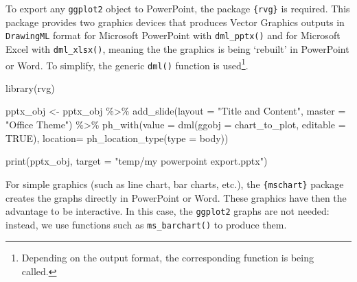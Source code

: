 \documentclass[
]{book}
\newenvironment{Shaded}{\begin{snugshade}}{\end{snugshade}}
\newcommand{\AttributeTok}[1]{\textcolor[rgb]{0.77,0.63,0.00}{#1}}
\newcommand{\ConstantTok}[1]{\textcolor[rgb]{0.00,0.00,0.00}{#1}}
\newcommand{\FunctionTok}[1]{\textcolor[rgb]{0.00,0.00,0.00}{#1}}
\newcommand{\NormalTok}[1]{#1}
\newcommand{\OtherTok}[1]{\textcolor[rgb]{0.56,0.35,0.01}{#1}}
\newcommand{\SpecialCharTok}[1]{\textcolor[rgb]{0.00,0.00,0.00}{#1}}
\newcommand{\StringTok}[1]{\textcolor[rgb]{0.31,0.60,0.02}{#1}}
\begin{document}
To export any \texttt{ggplot2} object to PowerPoint, the package \texttt{\{rvg\}} is required. This package provides two graphics devices that produces Vector Graphics outputs in \texttt{DrawingML} format for Microsoft PowerPoint with \texttt{dml\_pptx()} and for Microsoft Excel with \texttt{dml\_xlsx()}, meaning the the graphics is being `rebuilt' in PowerPoint or Word. To simplify, the generic \texttt{dml()} function is used\footnote{Depending on the output format, the corresponding function is being called.}.

\begin{Shaded}
\begin{Highlighting}[]
\FunctionTok{library}\NormalTok{(rvg)}

\NormalTok{pptx\_obj }\OtherTok{\textless{}{-}}\NormalTok{ pptx\_obj }\SpecialCharTok{\%\textgreater{}\%}
  \FunctionTok{add\_slide}\NormalTok{(}\AttributeTok{layout =} \StringTok{"Title and Content"}\NormalTok{, }\AttributeTok{master =} \StringTok{"Office Theme"}\NormalTok{) }\SpecialCharTok{\%\textgreater{}\%}
  \FunctionTok{ph\_with}\NormalTok{(}\AttributeTok{value =} \FunctionTok{dml}\NormalTok{(}\AttributeTok{ggobj =}\NormalTok{ chart\_to\_plot, }\AttributeTok{editable =} \ConstantTok{TRUE}\NormalTok{),}
          \AttributeTok{location=} \FunctionTok{ph\_location\_type}\NormalTok{(}\AttributeTok{type =} \StringTok{\textquotesingle{}body\textquotesingle{}}\NormalTok{))}

\FunctionTok{print}\NormalTok{(pptx\_obj, }\AttributeTok{target =} \StringTok{"temp/my powerpoint export.pptx"}\NormalTok{)}
\end{Highlighting}
\end{Shaded}

For simple graphics (such as line chart, bar charts, etc.), the \texttt{\{mschart\}} package creates the graphs directly in PowerPoint or Word. These graphics have then the advantage to be interactive.
In this case, the \texttt{ggplot2} graphs are not needed: instead, we use functions such as \texttt{ms\_barchart()} to produce them.
\end{document}
